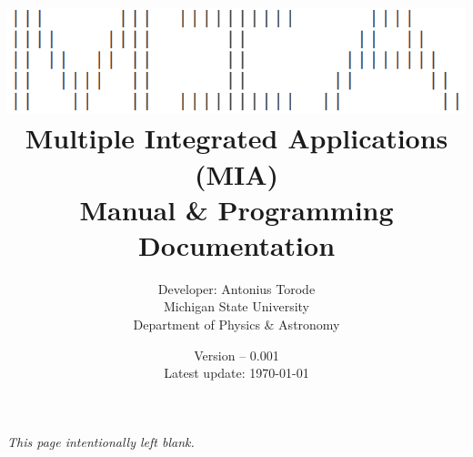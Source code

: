 \documentclass[openany,a4paper,11pt]{book}
\title{\vspace{0.1cm}  \includegraphics[scale=0.5]{./Images/MIA_cropped_Inverted.png} \vspace{.5cm} \\ Multiple Integrated Applications (MIA) \\  Manual \& Programming Documentation}
\author{Developer: Antonius Torode \\ Michigan State University \\ Department of Physics \& Astronomy}
\date{Version -- 0.001 \\ Latest update: \today}
\begin{document}
\frontmatter
\maketitle

\tableofcontents
\newpage
\vspace*{\fill}
\begin{center}
	\textit{This page intentionally left blank.}
\end{center}
\vspace*{\fill}

\mainmatter
\pagestyle{fancy}
\fancyhf{}
\fancyhead[RO, LE]{\thepage}







\backmatter


\end{document}
